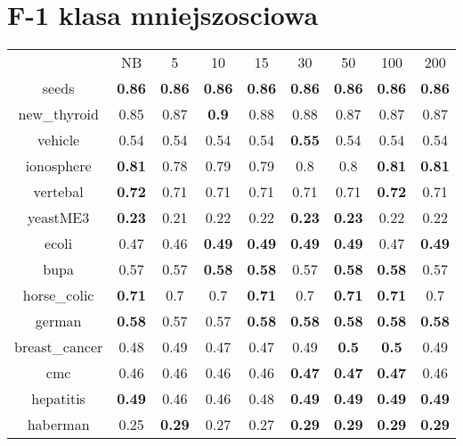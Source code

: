 \documentclass{article}%
\begin{document}
\section*{F{-}1 klasa mniejszosciowa}%
\begin{tabular}{c|cccccccc}%

&NB&5&10&15&30&50&100&200\\%

seeds&\textbf{0.86}&\textbf{0.86}&\textbf{0.86}&\textbf{0.86}&\textbf{0.86}&\textbf{0.86}&\textbf{0.86}&\textbf{0.86}\\%

new\_thyroid&0.85&0.87&\textbf{0.9}&0.88&0.88&0.87&0.87&0.87\\%

vehicle&0.54&0.54&0.54&0.54&\textbf{0.55}&0.54&0.54&0.54\\%

ionosphere&\textbf{0.81}&0.78&0.79&0.79&0.8&0.8&\textbf{0.81}&\textbf{0.81}\\%

vertebal&\textbf{0.72}&0.71&0.71&0.71&0.71&0.71&\textbf{0.72}&0.71\\%

yeastME3&\textbf{0.23}&0.21&0.22&0.22&\textbf{0.23}&\textbf{0.23}&0.22&0.22\\%

ecoli&0.47&0.46&\textbf{0.49}&\textbf{0.49}&\textbf{0.49}&\textbf{0.49}&0.47&\textbf{0.49}\\%

bupa&0.57&0.57&\textbf{0.58}&\textbf{0.58}&0.57&\textbf{0.58}&\textbf{0.58}&0.57\\%

horse\_colic&\textbf{0.71}&0.7&0.7&\textbf{0.71}&0.7&\textbf{0.71}&\textbf{0.71}&0.7\\%

german&\textbf{0.58}&0.57&0.57&\textbf{0.58}&\textbf{0.58}&\textbf{0.58}&\textbf{0.58}&\textbf{0.58}\\%

breast\_cancer&0.48&0.49&0.47&0.47&0.49&\textbf{0.5}&\textbf{0.5}&0.49\\%

cmc&0.46&0.46&0.46&0.46&\textbf{0.47}&\textbf{0.47}&\textbf{0.47}&0.46\\%

hepatitis&\textbf{0.49}&0.46&0.46&0.48&\textbf{0.49}&\textbf{0.49}&\textbf{0.49}&\textbf{0.49}\\%

haberman&0.25&\textbf{0.29}&0.27&0.27&\textbf{0.29}&\textbf{0.29}&\textbf{0.29}&\textbf{0.29}\\%


\end{tabular}
\end{document}
